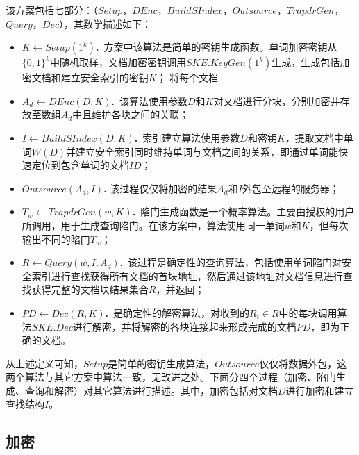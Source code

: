 \begin{defn}[抗信息泄漏的可搜索加密方案]
\label{defn:resist_trace}
该方案包括七部分：（$Setup$，$DEnc$，$BuildSIndex$，$Outsource$，$TrapdrGen$，$Query$，$Dec$），其数学描述如下：
\begin{itemize}
  \item \textbf{$K \leftarrow Setup(1^k)$.}\ 方案中该算法是简单的密钥生成函数。单词加密密钥从$\{0,1\}^k$中随机取样，文档加密密钥调用$SKE.KeyGen(1^k)$生成，生成包括加密文档和建立安全索引的密钥$K$；
将每个文档
  \item \textbf{$A_d \leftarrow DEnc(D, K)$.}\ 该算法使用参数$D$和$K$对文档进行分块，分别加密并存放至数组$A_d$中且维护各块之间的关联；

  \item \textbf{$I \leftarrow BuildSIndex(D, K)$.}\ 索引建立算法使用参数$D$和密钥$K$，提取文档中单词$W(D)$并建立安全索引同时维持单词与文档之间的关系，即通过单词能快速定位到包含单词的文档$ID$；

  \item \textbf{$Outsource(A_d, I)$.} 该过程仅仅将加密的结果$A_d$和$I$外包至远程的服务器；

  \item \textbf{$T_w \leftarrow TrapdrGen(w, K)$.}\ 陷门生成函数是一个概率算法。主要由授权的用户所调用，用于生成查询陷门。在该方案中，算法使用同一单词$w$和$K$，但每次输出不同的陷门$T_w$；

  \item \textbf{$R \leftarrow Query(w, I, A_d)$.}\ 该过程是确定性的查询算法，包括使用单词陷门对安全索引进行查找获得所有文档的首块地址，然后通过该地址对文档信息进行查找获得完整的文档块结果集合$R$，并返回；

  \item \textbf{$PD \leftarrow Dec(R, K)$.}\ 是确定性的解密算法，对收到的$R_i \in R$中的每块调用算法$SKE.Dec$进行解密，并将解密的各块连接起来形成完成的文档$PD$，即为正确的文档。
\end{itemize}
\end{defn}

从上述定义可知，$Setup$是简单的密钥生成算法，$Outsource$仅仅将数据外包，这两个算法与其它方案中算法一致，无改进之处。下面分四个过程（加密、陷门生成、查询和解密）对其它算法进行描述。其中，加密包括对文档$D$进行加密和建立查找结构$I$。

\subsection{加密}
\label{sec:searchpattern_scheme_encryption}


